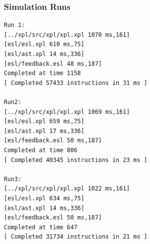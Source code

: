 \documentclass{beamer}
\begin{document}
\begin{frame}[fragile]
\frametitle{Simulation Runs}
\begin{lstlisting}
Run 1:
[../xpl/src/xpl/xpl.xpl 1070 ms,161]
[esl/esl.xpl 610 ms,75]
[esl/ast.xpl 14 ms,336]
[esl/feedback.esl 48 ms,187]
Completed at time 1158
[ Completed 57433 instructions in 31 ms ]

Run2:
[../xpl/src/xpl/xpl.xpl 1069 ms,161]
[esl/esl.xpl 659 ms,75]
[esl/ast.xpl 17 ms,336]
[esl/feedback.esl 50 ms,187]
Completed at time 806
[ Completed 40345 instructions in 23 ms ]

Run3:
[../xpl/src/xpl/xpl.xpl 1022 ms,161]
[esl/esl.xpl 634 ms,75]
[esl/ast.xpl 14 ms,336]
[esl/feedback.esl 50 ms,187]
Completed at time 647
[ Completed 31734 instructions in 21 ms ]
\end{lstlisting}
\end{frame}
\end{document}

